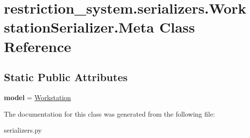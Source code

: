 \hypertarget{classrestriction__system_1_1serializers_1_1WorkstationSerializer_1_1Meta}{}\section{restriction\+\_\+system.\+serializers.\+Workstation\+Serializer.\+Meta Class Reference}
\label{classrestriction__system_1_1serializers_1_1WorkstationSerializer_1_1Meta}
\subsection*{Static Public Attributes}
\begin{DoxyCompactItemize}
\item 
\hypertarget{classrestriction__system_1_1serializers_1_1WorkstationSerializer_1_1Meta_a0cb44d733df02c3ab223101a142ea3b7}{}{\bfseries model} = \hyperlink{classrestriction__system_1_1models_1_1Workstation}{Workstation}\label{classrestriction__system_1_1serializers_1_1WorkstationSerializer_1_1Meta_a0cb44d733df02c3ab223101a142ea3b7}

\end{DoxyCompactItemize}


The documentation for this class was generated from the following file\+:\begin{DoxyCompactItemize}
\item 
serializers.\+py\end{DoxyCompactItemize}
